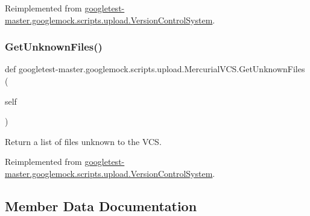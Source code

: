 Reimplemented from \mbox{\hyperlink{classgoogletest-master_1_1googlemock_1_1scripts_1_1upload_1_1_version_control_system_af5a7da9e4adf46f51e6a3c077e36688d}{googletest-\/master.\+googlemock.\+scripts.\+upload.\+Version\+Control\+System}}.

\mbox{\label{classgoogletest-master_1_1googlemock_1_1scripts_1_1upload_1_1_mercurial_v_c_s_af98b91231f0042acd7ede5107c455339}} 
\subsubsection{\texorpdfstring{GetUnknownFiles()}{GetUnknownFiles()}}
{\footnotesize\ttfamily def googletest-\/master.\+googlemock.\+scripts.\+upload.\+Mercurial\+V\+C\+S.\+Get\+Unknown\+Files (\begin{DoxyParamCaption}\item[{}]{self }\end{DoxyParamCaption})}

\begin{DoxyVerb}Return a list of files unknown to the VCS.\end{DoxyVerb}
 

Reimplemented from \mbox{\hyperlink{classgoogletest-master_1_1googlemock_1_1scripts_1_1upload_1_1_version_control_system_a22b33170a18fda5f1479c0be6f279dc6}{googletest-\/master.\+googlemock.\+scripts.\+upload.\+Version\+Control\+System}}.



\subsection{Member Data Documentation}
\mbox{\label{classgoogletest-master_1_1googlemock_1_1scripts_1_1upload_1_1_mercurial_v_c_s_a9e3660fbf54f16b181c7a23ed9d87916}} 

